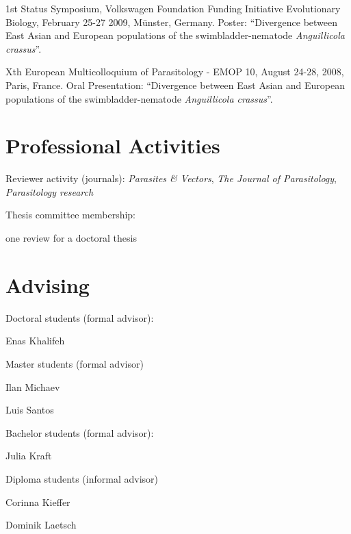 \documentclass[10pt,a4paper]{article}
\renewenvironment{itemize}{
  \begin{list}{}{
    \setlength{\leftmargin}{2.5em}
    \setlength{\itemsep}{0.25em}
    \setlength{\parskip}{0pt}
    \setlength{\parsep}{0.25em}
  }
}{
  \end{list}
}
\begin{document}
\begin{itemize}
\item 1st Status Symposium, Volkswagen Foundation Funding Initiative
  Evolutionary Biology, February 25-27 2009, M\"unster,
  Germany. Poster: ``Divergence between East Asian and European
  populations of the swimbladder-nematode \textit{Anguillicola
    crassus}''.

\item Xth European Multicolloquium of Parasitology - EMOP 10, August
  24-28, 2008, Paris, France. Oral Presentation: ``Divergence between
  East Asian and European populations of the swimbladder-nematode
  \textit{Anguillicola crassus}''.

\end{itemize}

\section*{Professional Activities}
\begin{itemize}
\item Reviewer activity (journals):
  \textit{Parasites \& Vectors}, \textit{The Journal
    of Parasitology}, \textit{Parasitology research}
\item Thesis committee membership: 
  \begin{itemize}
  \item[2014] one review for a doctoral thesis
  \end{itemize}
\end{itemize}

\section*{Advising}
\begin{itemize}
\item Doctoral students (formal advisor):
  \begin{itemize}
  \item[2014--Present] Enas Khalifeh
  \end{itemize}
\item Master students (formal advisor)
  \begin{itemize}
  \item[2014--Present] Ilan Michaev
  \item[2014] Luis Santos
  \end{itemize}
\item Bachelor students (formal advisor):
  \begin{itemize}
  \item[2014--Present] Julia Kraft
  \end{itemize}
\item Diploma students (informal advisor)
  \begin{itemize}
  \item [2011] Corinna Kieffer
  \item [2010] Dominik Laetsch 
  \end{itemize}
\end{itemize}
\end{document}
